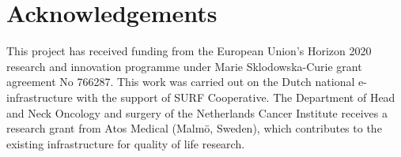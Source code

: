 \documentclass[a4paper]{article}
\begin{document}
\section{Acknowledgements}
This project has received funding from the European Union's Horizon
2020 research and innovation programme under Marie Sklodowska-Curie
grant agreement No 766287.
This work was carried out on the Dutch national e-infrastructure with the support of SURF Cooperative.
The Department of Head and Neck Oncology and surgery of the Netherlands
Cancer Institute receives a research grant from Atos Medical (Malmö,
Sweden), which contributes to the existing infrastructure for quality of
life research.




\end{document}
